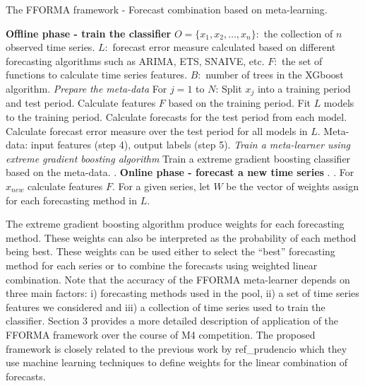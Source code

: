 \documentclass[11pt,a4paper,]{article}
\theoremstyle{definition}
\theoremstyle{definition}
\theoremstyle{definition}
\theoremstyle{remark}
\begin{document}
\begin{algorithm}[!ht]
  \caption{The FFORMA framework - Forecast combination based on meta-learning. }
  \label{alg:algo-lab}
  \begin{algorithmic}[1]
    \Statex \textbf{Offline phase - train the classifier}
    \Statex {}
    \Statex \hspace{1cm}$O=\{x_1, x_2, \dots,x_n\}:$ the collection of $n$ observed time series.
      \Statex \hspace{1cm}$L:$ forecast error measure calculated based on different forecasting algorithms such as ARIMA, ETS, SNAIVE, etc.
         \Statex \hspace{1cm}$F:$ the set of functions to calculate time series features.
         \Statex \hspace{1cm}$B:$ number of trees in the XGboost algorithm.
     \Statex {}
      \Statex \hspace{1cm}
    \Statex \textit{Prepare the meta-data}
    \Statex For $j=1$ to $N$:
            \State Split $x_j$ into a training period and test period.
            \State Calculate features $F$ based on the training period.
            \State Fit $L$ models to the training period.
            \State Calculate forecasts for the test period from each model.
            \State Calculate forecast error measure over the test period for all models in $L$.
            \State Meta-data: input features (step 4), output labels (step 5).
     \Statex
    \Statex \textit{Train a meta-learner using extreme gradient boosting algorithm}
            \State Train a extreme gradient boosting classifier based on the meta-data.
            .
    \Statex
     \Statex \textbf{Online phase - forecast a new time series}
    \Statex {}
    \Statex \hspace{1cm} .
     \Statex {}
      \Statex \hspace{1cm}.
  \State For $x_{new}$ calculate features $F$.
  \State For a given series, let $W$ be the vector of weights assign for each forecasting method in $L$.  
   \end{algorithmic}
\end{algorithm}

The extreme gradient boosting algorithm produce weights for each
forecasting method. These weights can also be interpreted as the
probability of each method being best. These weights can be used either
to select the ``best'' forecasting method for each series or to combine
the forecasts using weighted linear combination. Note that the accuracy
of the FFORMA meta-learner depends on three main factors: i) forecasting
methods used in the pool, ii) a set of time series features we
considered and iii) a collection of time series used to train the
classifier. Section 3 provides a more detailed description of
application of the FFORMA framework over the course of M4 competition.
The proposed framework is closely related to the previous work by
ref\_prudencio which they use machine learning techniques to define
weights for the linear combination of forecasts.
\end{document}
